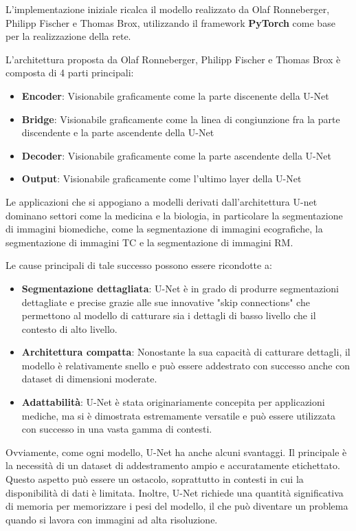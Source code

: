 L'implementazione iniziale ricalca il modello realizzato da Olaf Ronneberger,
Philipp Fischer e Thomas Brox, utilizzando il framework \textbf{PyTorch}
\cite{pytorch} come base per la realizzazione della rete.



L'architettura proposta da Olaf Ronneberger, Philipp Fischer e Thomas Brox è
composta di 4 parti principali: \begin{itemize} \item \textbf{Encoder}:
Visionabile graficamente come la parte discenente della U-Net \item
\textbf{Bridge}: Visionabile graficamente come la linea di congiunzione fra la
parte discendente e la parte ascendente della U-Net \item \textbf{Decoder}:
Visionabile graficamente come la parte ascendente della U-Net \item
\textbf{Output}: Visionabile graficamente come l'ultimo layer della U-Net
\end{itemize}

Le applicazioni che si appogiano a modelli derivati dall'architettura U-net
dominano settori come la medicina e la biologia, in particolare la segmentazione
di immagini biomediche, come la segmentazione di immagini ecografiche, la
segmentazione di immagini TC e la segmentazione di immagini RM.

Le cause principali di tale successo possono essere ricondotte a:
\begin{itemize} \item \textbf{Segmentazione dettagliata}: U-Net è in grado di
produrre segmentazioni dettagliate e precise grazie alle sue innovative "skip
connections" che permettono al modello di catturare sia i dettagli di basso
livello che il contesto di alto livello.  \item \textbf{Architettura compatta}:
Nonostante la sua capacità di catturare dettagli, il modello è relativamente
snello e può essere addestrato con successo anche con dataset di dimensioni
moderate.  \item \textbf{Adattabilità}: U-Net è stata originariamente concepita
per applicazioni mediche, ma si è dimostrata estremamente versatile e può essere
utilizzata con successo in una vasta gamma di contesti.  \end{itemize}

Ovviamente, come ogni modello, U-Net ha anche alcuni svantaggi. Il principale è
la necessità di un dataset di addestramento ampio e accuratamente etichettato.
Questo aspetto può essere un ostacolo, soprattutto in contesti in cui la
disponibilità di dati è limitata. Inoltre, U-Net richiede una quantità
significativa di memoria per memorizzare i pesi del modello, il che può
diventare un problema quando si lavora con immagini ad alta risoluzione.




